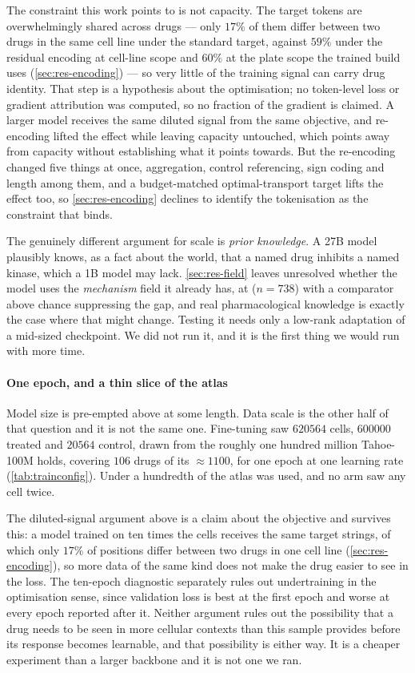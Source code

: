 The constraint this work points to is not capacity. The target tokens are
overwhelmingly shared across drugs --- only $17\%$ of them differ between two
drugs in the same cell line under the standard target, against $59\%$ under the
residual encoding at cell-line scope and $60\%$ at the plate scope the trained
build uses (\cref{sec:res-encoding}) --- so very little of the training signal
can carry drug identity. That step is a hypothesis about the optimisation; no
token-level loss or gradient attribution was computed, so no fraction of the
gradient is claimed. A larger model receives the same diluted signal from the
same objective, and re-encoding lifted the effect while leaving
capacity untouched, which points away from capacity without establishing what it
points towards. But the re-encoding changed five things at once, aggregation,
control referencing, sign coding and length among them, and a budget-matched
optimal-transport target lifts the effect too, so \cref{sec:res-encoding}
declines to identify the tokenisation as the constraint that binds.

The genuinely different argument for scale is \emph{prior knowledge}. A 27B
model plausibly knows, as a fact about the world, that a named drug inhibits a
named kinase, which a 1B model may lack. \cref{sec:res-field} leaves
unresolved whether the model uses the \emph{mechanism} field it already has, at
 ($n = \num{738}$) with a comparator above chance
suppressing the gap, and real pharmacological knowledge is exactly the case
where that might change. Testing it needs only a low-rank adaptation of a
mid-sized checkpoint. We did not run it, and it is the first thing we would run
with more time.

\paragraph{One epoch, and a thin slice of the atlas} Model size is pre-empted
above at some length. Data scale is the other half of that question and it is
not the same one. Fine-tuning saw $\num{620564}$ cells, $\num{600000}$ treated
and $\num{20564}$ control, drawn from the roughly one hundred million
Tahoe-100M holds, covering $106$ drugs of its $\approx\num{1100}$, for one
epoch at one learning rate (\cref{tab:trainconfig}). Under a hundredth of the
atlas was used, and no arm saw any cell twice.

The diluted-signal argument above is a claim about the objective and survives
this: a model trained on ten times the cells receives the same target strings,
of which only $17\%$ of positions differ between two drugs in one cell line
(\cref{sec:res-encoding}), so more data of the same kind does not make the drug
easier to see in the loss. The ten-epoch diagnostic separately rules out
undertraining in the optimisation sense, since validation loss is best at the
first epoch and worse at every epoch reported after it. Neither argument rules out
the possibility that a drug needs to be seen in more cellular contexts than
this sample provides before its response becomes learnable, and that
possibility is \notestablished either way. It is a cheaper experiment than a
larger backbone and it is not one we ran.


